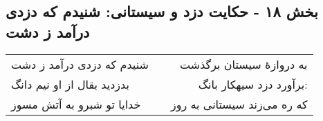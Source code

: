\begin{center}
\section*{بخش ۱۸ - حکایت دزد و سیستانی: شنیدم که دزدی درآمد ز دشت}
\label{sec:018}
\begin{longtable}{l p{0.5cm} r}
شنیدم که دزدی درآمد ز دشت
&&
به دروازهٔ سیستان برگذشت
\\
بدزدید بقال از او نیم دانگ
&&
برآورد دزد سیهکار بانگ:
\\
خدایا تو شبرو به آتش مسوز
&&
که ره می‌زند سیستانی به روز
\\
\end{longtable}
\end{center}

